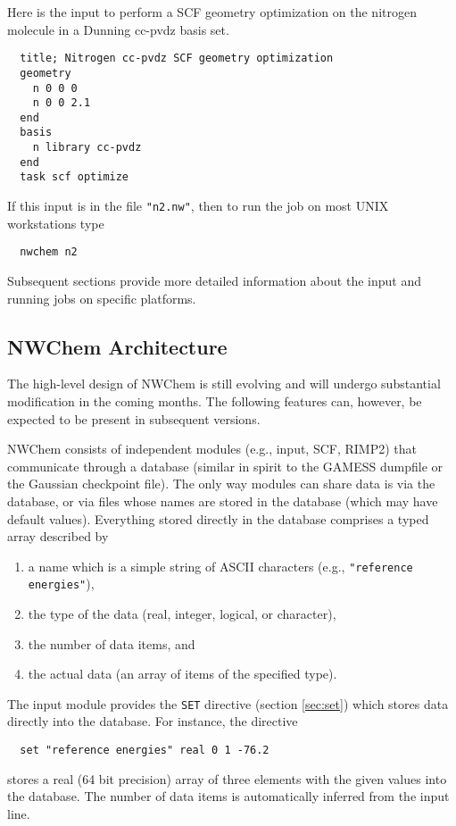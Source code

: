   Here is the input to perform a SCF geometry optimization on the nitrogen
molecule in a Dunning cc-pvdz basis set.
\begin{verbatim}
  title; Nitrogen cc-pvdz SCF geometry optimization
  geometry 
    n 0 0 0
    n 0 0 2.1
  end
  basis
    n library cc-pvdz
  end
  task scf optimize
\end{verbatim}

If this input is in the file \verb+"n2.nw"+, then to run the job on
most UNIX workstations type
\begin{verbatim}
  nwchem n2
\end{verbatim}
Subsequent sections provide more detailed information about the input
and running jobs on specific platforms.

\subsection{NWChem Architecture}
\label{sec:arch}

The high-level design of NWChem is still evolving and will undergo
substantial modification in the coming months.  The following features
can, however, be expected to be present in subsequent versions.

NWChem consists of independent modules (e.g., input, SCF, RIMP2) that
communicate through a database (similar in spirit to the GAMESS
dumpfile or the Gaussian checkpoint file).  The only way modules can
share data is via the database, or via files whose names are stored in
the database (which may have default values).  Everything stored
directly in the database comprises a typed array described by
\begin{enumerate}
\item a name which is a simple string of ASCII characters (e.g., 
      \verb+"reference energies"+),
\item the type of the data (real, integer, logical, or character), 
\item the number of data items, and
\item the actual data (an array of items of the specified type).
\end{enumerate}

The input module provides the \verb+SET+ directive (section
\ref{sec:set}) which stores data directly into the database.  For
instance, the directive
\begin{verbatim}
  set "reference energies" real 0 1 -76.2
\end{verbatim}
stores a real (64 bit precision) array of three elements with the
given values into the database.  The number of data items is automatically
inferred from the input line.

